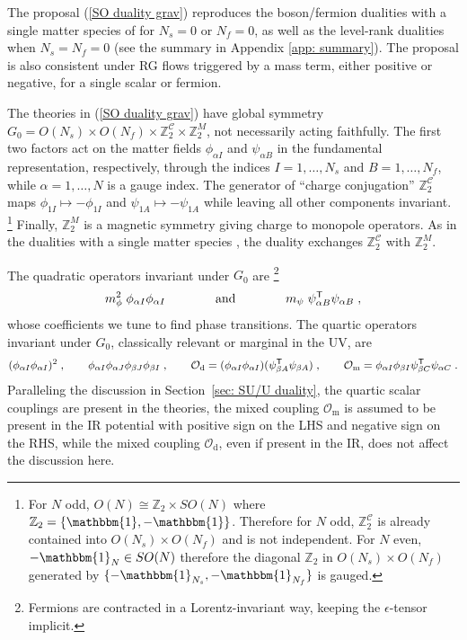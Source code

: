 \documentclass[a4paper, 12pt]{article}
\numberwithin{equation}{section}
\newcommand{\be}{\begin{equation}} \newcommand{\ee}{\end{equation}}
\newcommand{\cC}{\mathcal{C}}
\newcommand{\cO}{\mathcal{O}}
\newcommand{\bZ}{\mathbb{Z}}
\newcommand{\sT}{{\sf{T}}}
\newcommand{\unit}{\mathbbm{1}}
\begin{document}
The proposal (\ref{SO duality grav}) reproduces the boson/fermion dualities with a single matter species of \cite{Aharony:2016jvv, Metlitski:2016dht} for $N_s=0$ or \mbox{$N_f=0$}, as well as the level-rank dualities when $N_s = N_f = 0$ (see the summary in Appendix \ref{app: summary}). The proposal is also consistent under RG flows triggered by a mass term, either positive or negative, for a single scalar or fermion.

The theories in (\ref{SO duality grav}) have global symmetry $G_0 = O(N_s) \times O(N_f) \times \bZ_2^\cC \times \bZ_2^M$, not necessarily acting faithfully. The first two factors act on the matter fields $\phi_{\alpha I}$ and $\psi_{\alpha B}$ in the fundamental representation, respectively, through the indices $I=1,\dots,N_s$ and $B =1,\dots, N_f$, while $\alpha=1,\dots, N$ is a gauge index. The generator of ``charge conjugation'' $\bZ_2^\cC$ maps $\phi_{1I} \mapsto -\phi_{1I}$ and $\psi_{1A} \mapsto - \psi_{1A}$ while leaving all other components invariant.%
\footnote{For $N$ odd, $O(N) \cong \bZ_2 \times SO(N)$ where $\bZ_2 = \{\unit, - \unit\}$. Therefore for $N$ odd, $\bZ_2^\cC$ is already contained into $O(N_s) \times O(N_f)$ and is not independent. For $N$ even, $-\unit_N \in SO(N)$ therefore the diagonal $\bZ_2$ in $O(N_s) \times O(N_f)$ generated by $\{-\unit_{N_s}, - \unit_{N_f}\}$ is gauged.}
Finally, $\bZ_2^M$ is a magnetic symmetry giving charge to monopole operators. As in the dualities with a single matter species \cite{Aharony:2016jvv}, the duality exchanges $\bZ_2^\cC$ with $\bZ_2^M$.

The quadratic operators invariant under $G_0$ are%
\footnote{Fermions are contracted in a Lorentz-invariant way, keeping the $\epsilon$-tensor implicit.}
\be
m_\phi^2 \; \phi_{\alpha I} \phi_{\alpha I} \qquad\qquad\text{and}\qquad\qquad m_\psi\; \psi^\sT_{\alpha B} \psi_{\alpha B} \;,
\ee
whose coefficients we tune to find phase transitions. The quartic operators invariant under $G_0$, classically relevant or marginal in the UV, are
\be
\label{SO quartic couplings}
(\phi_{\alpha I} \phi_{\alpha I})^2 \;,\qquad \phi_{\alpha I} \phi_{\alpha J} \phi_{\beta J} \phi_{\beta I} \;,\qquad \cO_\text{d} = (\phi_{\alpha I} \phi_{\alpha I})(\psi^\sT_{\beta A} \psi_{\beta A}) \;,\qquad \cO_\text{m} = \phi_{\alpha I} \phi_{\beta I} \psi^\sT_{\beta C} \psi_{\alpha C} \;.
\ee
Paralleling the discussion in Section~\ref{sec: SU/U duality}, the quartic scalar couplings are present in the theories, the mixed coupling $\cO_\text{m}$ is assumed to be present in the IR potential with positive sign on the LHS and negative sign on the RHS, while the mixed coupling $\cO_\text{d}$, even if present in the IR, does not affect the discussion here.
\end{document}
